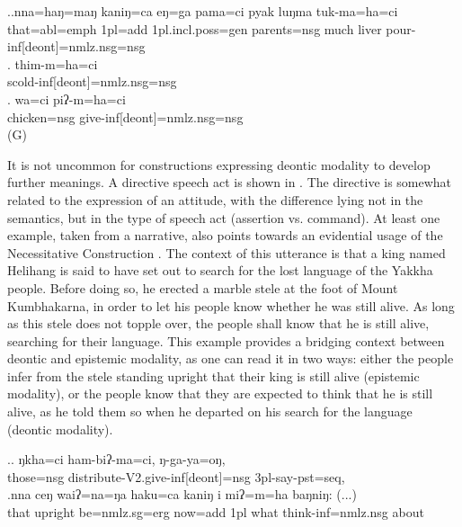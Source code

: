 \ex.\ag.nna=haŋ=maŋ kaniŋ=ca    eŋ=ga  pama=ci pyak luŋma tuk-ma=ha=ci\\
that{\sc =abl=emph} {\sc 1pl=add} {\sc 1pl.incl.poss=gen} parents{\sc =nsg} much liver pour{\sc -inf[deont]=nmlz.nsg=nsg} \\
	
\bg. thim-m=ha=ci\\
	scold{\sc -inf[deont]=nmlz.nsg=nsg}\\
\bg. wa=ci piʔ-m=ha=ci\\
chicken{\sc =nsg} give-{\sc inf[deont]=nmlz.nsg=nsg}\\
 (G)
	
	
It is not uncommon for constructions expressing deontic modality to develop further meanings. A directive speech act is shown in  \Next[a]. The directive is somewhat related to the expression of an attitude, with the difference lying not in the semantics, but in the type of speech act (assertion vs. command). At least one example, taken from a narrative, also points towards an evidential usage of the Necessitative Construction \Next[b]. The context of this utterance is that a king named Helihang is said to have set out to search for the lost language of the Yakkha people. Before doing so, he erected a marble stele at the foot of Mount Kumbhakarna, in order to let his people know whether he was still alive. As long as this stele does not topple over, the people shall know that he is still alive, searching for their language. This example provides a bridging context between deontic and epistemic modality, as one can read it in two ways: either the people infer from the stele standing upright that their king is still alive (epistemic modality), or the people know that they are expected to think that he is still alive, as he told them so when he departed on his search for the language (deontic modality). 


\ex.\ag. ŋkha=ci ham-biʔ-ma=ci,  ŋ-ga-ya=oŋ,\\
those{\sc =nsg} distribute{\sc -V2.give-inf[deont]=nsg} {\sc 3pl-}say{\sc -pst=seq}, \\
\bg.nna  ceŋ    waiʔ=na=ŋa      haku=ca   kaniŋ i    miʔ=m=ha baŋniŋ: (...)\\
that upright be{\sc [3sg]=nmlz.sg=erg} now{\sc =add} {\sc 1pl} what think{\sc -inf=nmlz.nsg} about\\
 


